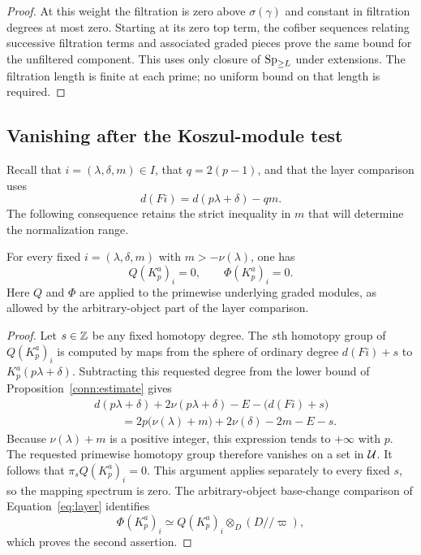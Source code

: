 \begin{proof}
At this weight the filtration is zero above
$\sigma(\gamma)$ and constant in filtration degrees at most
zero. Starting at its zero top term, the cofiber sequences
relating successive filtration terms and associated graded
pieces prove the same bound for the unfiltered component.
This uses only closure of $\mathrm{Sp}_{\geq L}$ under extensions.
The filtration length is finite at each prime; no uniform
bound on that length is required.
\end{proof}

\subsection{Vanishing after the Koszul-module test}

Recall that $i=(\lambda,\delta,m)\in I$, that $q=2(p-1)$,
and that the layer comparison uses
\[
 d(Fi)=d(p\lambda+\delta)-qm.
\]
The following consequence retains the strict inequality in
$m$ that will determine the normalization range.

\begin{lemma}\label{conn:degree-gap}
For every fixed $i=(\lambda,\delta,m)$ with
$m>-\nu(\lambda)$, one has
\[
 Q(K_p^a)_i=0,\qquad \Phi(K_p^a)_i=0.
\]
Here $Q$ and $\Phi$ are applied to the primewise underlying
graded modules, as allowed by the arbitrary-object part of
the layer comparison.
\end{lemma}

\begin{proof}
Let $s\in\mathbb Z$ be any fixed homotopy degree. The $s$th homotopy
group of $Q(K_p^a)_i$ is computed by maps from the sphere of
ordinary degree $d(Fi)+s$ to $K_p^a(p\lambda+\delta)$.
Subtracting this requested degree from the lower bound of
Proposition~\ref{conn:estimate} gives
\begin{align*}
 &d(p\lambda+\delta)+2\nu(p\lambda+\delta)-E
       -\big(d(Fi)+s\big)\\
 &\hspace{1cm}=
 2p\big(\nu(\lambda)+m\big)
       +2\nu(\delta)-2m-E-s.
\end{align*}
Because $\nu(\lambda)+m$ is a positive integer, this expression
tends to $+\infty$ with $p$. The requested primewise homotopy
group therefore vanishes on a set in $\mathcal U$. It follows that
$\pi_s Q(K_p^a)_i=0$. This argument applies separately to
every fixed $s$, so the mapping spectrum is zero. The
arbitrary-object base-change comparison of
Equation~\eqref{eq:layer} identifies
\[
 \Phi(K_p^a)_i\simeq
 Q(K_p^a)_i\otimes_D(D//\varpi),
\]
which proves the second assertion.
\end{proof}

